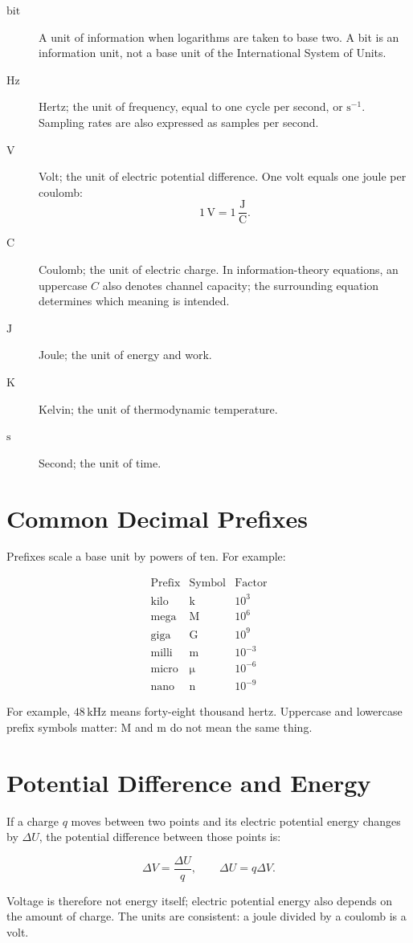 \begin{description}
  \item[\(\mathrm{bit}\)] A unit of information when logarithms are taken to base two. A bit is an information unit, not a base unit of the International System of Units.
  \item[\(\mathrm{Hz}\)] Hertz; the unit of frequency, equal to one cycle per second, or \(\mathrm{s}^{-1}\). Sampling rates are also expressed as samples per second.
  \item[\(\mathrm{V}\)] Volt; the unit of electric potential difference. One volt equals one joule per coulomb:
  \[
  1\,\mathrm{V}=1\,\frac{\mathrm{J}}{\mathrm{C}}.
  \]
  \item[\(\mathrm{C}\)] Coulomb; the unit of electric charge. In information-theory equations, an uppercase \(C\) also denotes channel capacity; the surrounding equation determines which meaning is intended.
  \item[\(\mathrm{J}\)] Joule; the unit of energy and work.
  \item[\(\mathrm{K}\)] Kelvin; the unit of thermodynamic temperature.
  \item[\(\mathrm{s}\)] Second; the unit of time.
\end{description}

\section{Common Decimal Prefixes}

Prefixes scale a base unit by powers of ten. For example:

\[
\begin{array}{c|c|c}
\text{Prefix} & \text{Symbol} & \text{Factor}\\
\hline
\text{kilo} & \mathrm{k} & 10^3\\
\text{mega} & \mathrm{M} & 10^6\\
\text{giga} & \mathrm{G} & 10^9\\
\text{milli} & \mathrm{m} & 10^{-3}\\
\text{micro} & \mathrm{\mu} & 10^{-6}\\
\text{nano} & \mathrm{n} & 10^{-9}
\end{array}
\]

For example, \(48\,\mathrm{kHz}\) means forty-eight thousand hertz. Uppercase and lowercase prefix symbols matter: \(\mathrm{M}\) and \(\mathrm{m}\) do not mean the same thing.

\section{Potential Difference and Energy}

If a charge \(q\) moves between two points and its electric potential energy changes by \(\Delta U\), the potential difference between those points is:

\[
\Delta V=\frac{\Delta U}{q},
\qquad
\Delta U=q\Delta V.
\]

Voltage is therefore not energy itself; electric potential energy also depends on the amount of charge. The units are consistent: a joule divided by a coulomb is a volt.
